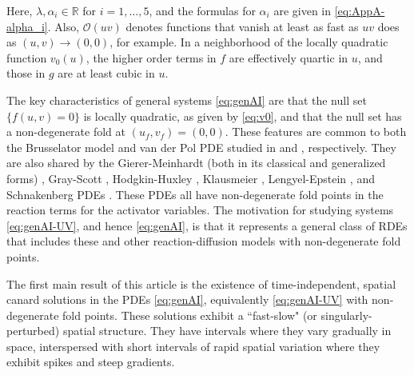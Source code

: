 \documentclass[11pt]{article}
\numberwithin{equation}{section}
\begin{document}
%
\noindent 
Here, $\lambda, \alpha_i \in \mathbb{R}$ for $i=1,\ldots,5$,
and the formulas for $\alpha_i$ are given in \eqref{eq:AppA-alpha_i}.
Also, $\mathcal{O}(uv)$ denotes functions that vanish at least as fast as $uv$ does as $(u,v)\to (0,0)$, for example.
In a neighborhood of the locally quadratic function $v_0(u)$, the higher order terms in $f$ are effectively quartic in $u$, and those in $g$ are at least cubic in $u$.

The key characteristics of general systems \eqref{eq:genAI} are that the null set $\{ f(u,v)=0 \}$ is locally quadratic, as given by \eqref{eq:v0}, and that the null set has a non-degenerate fold at $(u_f,v_f)=(0,0)$.
These features are common to both the Brusselator model and van der Pol PDE studied in \cite{JDKV2026} and \cite{VDK2025}, respectively.
They are also shared by the Gierer-Meinhardt (both in its classical and generalized forms) \cite{EK2005,GM-orig,Me1982,M1989,Mu1982,W1997}, Gray-Scott \cite{DGK2002,GS1997,Pearson1993,SU2017}, Hodgkin-Huxley \cite{HH1952,M1989}, 
Klausmeier \cite{K1999,SDHR2013}, 
Lengyel-Epstein \cite{LE1992,LE1991,SU2017,W1997}, 
and Schnakenberg PDEs \cite{EK2005,M1989,S1979,SU2017}.
These PDEs all have non-degenerate fold points in the reaction terms for the activator variables.
The motivation for studying systems \eqref{eq:genAI-UV}, and hence \eqref{eq:genAI}, is that it represents a general class of RDEs that includes these and other reaction-diffusion models with non-degenerate fold points. 

The first main result of this article is the existence of time-independent, spatial canard solutions in the PDEs \eqref{eq:genAI}, equivalently \eqref{eq:genAI-UV} with non-degenerate fold points.
These solutions exhibit a ``fast-slow" (or singularly-perturbed) spatial structure.
They have intervals where they vary gradually in space, interspersed with short intervals of rapid spatial variation where they exhibit spikes and steep gradients.
\end{document}
